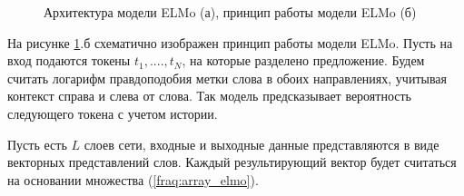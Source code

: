 \documentclass[a4paper,14pt]{article}
\begin{document}
\begin{figure}[H]
	\begin{minipage}[h]{0.499\linewidth}
	\end{minipage}
	\hfill
	\begin{minipage}[h]{0.499\linewidth}
	\end{minipage}
	\caption{Архитектура модели ELMo (а), принцип работы модели ELMo (б)}
	\label{fig:elmostructure}
\end{figure}

На рисунке \ref{fig:elmostructure}.б схематично изображен принцип работы модели ELMo.
Пусть на вход подаются токены $t_1, ...., t_N$, на которые разделено предложение.
Будем считать логарифм правдоподобия метки слова в обоих направлениях, учитывая контекст справа и слева от слова.
Так модель предсказывает вероятность следующего токена с учетом истории.

Пусть есть $L$ слоев сети, входные и выходные данные представляются в виде векторных представлений слов.
Каждый результирующий вектор будет считаться на основании множества (\ref{fraq:array_elmo}).
\end{document}
